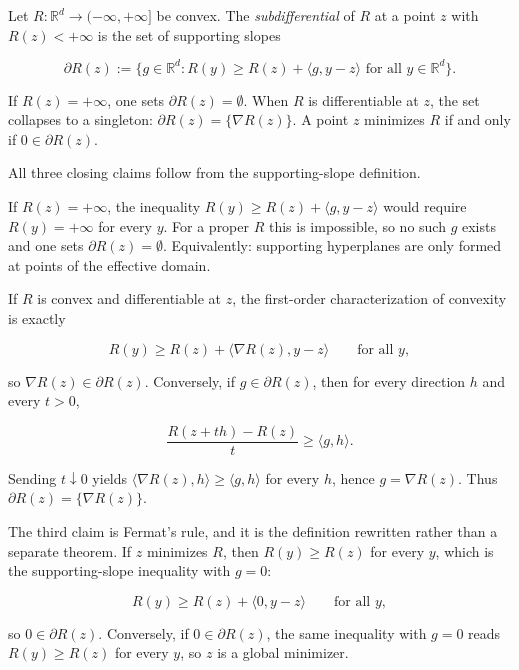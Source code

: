\documentclass[11pt,a4paper]{article}
\theoremstyle{definition}
\begin{document}
\begin{definition}\label{def:subdifferential}
Let $R:\mathbb{R}^d\to(-\infty,+\infty]$ be convex. The \emph{subdifferential} of $R$ at a point $z$ with $R(z)<+\infty$ is the set of supporting slopes

\[
\partial R(z)
:=
\bigl\{
g\in\mathbb{R}^d
:
R(y)\geq R(z)+\langle g,y-z\rangle
\text{ for all }y\in\mathbb{R}^d
\bigr\}.
\]

If $R(z)=+\infty$, one sets $\partial R(z)=\emptyset$. When $R$ is differentiable at $z$, the set collapses to a singleton: $\partial R(z)=\{\nabla R(z)\}$. A point $z$ minimizes $R$ if and only if $0\in\partial R(z)$.
\end{definition}

All three closing claims follow from the supporting-slope definition.

If $R(z)=+\infty$, the inequality $R(y)\geq R(z)+\langle g,y-z\rangle$ would require $R(y)=+\infty$ for every $y$. For a proper $R$ this is impossible, so no such $g$ exists and one sets $\partial R(z)=\emptyset$. Equivalently: supporting hyperplanes are only formed at points of the effective domain.

If $R$ is convex and differentiable at $z$, the first-order characterization of convexity is exactly

\[
R(y)\geq R(z)+\langle\nabla R(z),y-z\rangle
\qquad\text{for all }y,
\]

so $\nabla R(z)\in\partial R(z)$. Conversely, if $g\in\partial R(z)$, then for every direction $h$ and every $t>0$,

\[
\frac{R(z+th)-R(z)}{t}\geq\langle g,h\rangle.
\]

Sending $t\downarrow 0$ yields $\langle\nabla R(z),h\rangle\geq\langle g,h\rangle$ for every $h$, hence $g=\nabla R(z)$. Thus $\partial R(z)=\{\nabla R(z)\}$.

The third claim is Fermat's rule, and it is the definition rewritten rather than a separate theorem. If $z$ minimizes $R$, then $R(y)\geq R(z)$ for every $y$, which is the supporting-slope inequality with $g=0$:

\[
R(y)\geq R(z)+\langle 0,y-z\rangle
\qquad\text{for all }y,
\]

so $0\in\partial R(z)$. Conversely, if $0\in\partial R(z)$, the same inequality with $g=0$ reads $R(y)\geq R(z)$ for every $y$, so $z$ is a global minimizer.
\end{document}
